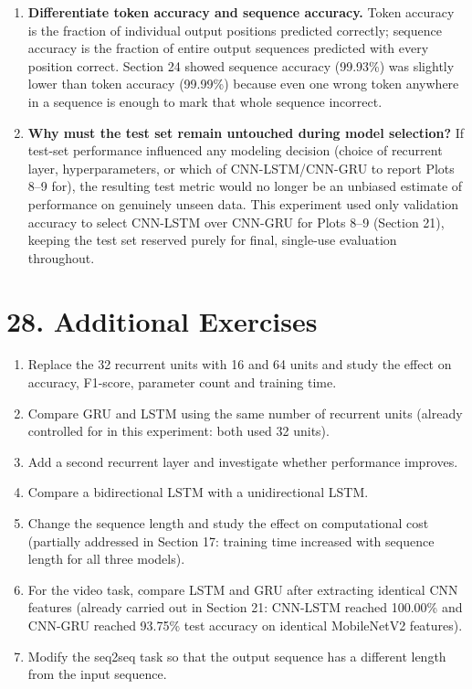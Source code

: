 \documentclass[10pt]{article}
\begin{document}
\begin{enumerate}
\item \textbf{Differentiate token accuracy and sequence accuracy.}
Token accuracy is the fraction of individual output positions predicted
correctly; sequence accuracy is the fraction of entire output sequences
predicted with every position correct. Section 24 showed sequence accuracy
(99.93\%) was slightly lower than token accuracy (99.99\%) because even one
wrong token anywhere in a sequence is enough to mark that whole sequence
incorrect.

\item \textbf{Why must the test set remain untouched during model
selection?}
If test-set performance influenced any modeling decision (choice of
recurrent layer, hyperparameters, or which of CNN-LSTM/CNN-GRU to report
Plots 8--9 for), the resulting test metric would no longer be an unbiased
estimate of performance on genuinely unseen data. This experiment used only
validation accuracy to select CNN-LSTM over CNN-GRU for Plots 8--9 (Section
21), keeping the test set reserved purely for final, single-use evaluation
throughout.

\end{enumerate}

\section*{28. Additional Exercises}

\begin{enumerate}
\item Replace the 32 recurrent units with 16 and 64 units and study the
effect on accuracy, F1-score, parameter count and training time.
\item Compare GRU and LSTM using the same number of recurrent units (already
controlled for in this experiment: both used 32 units).
\item Add a second recurrent layer and investigate whether performance
improves.
\item Compare a bidirectional LSTM with a unidirectional LSTM.
\item Change the sequence length and study the effect on computational cost
(partially addressed in Section 17: training time increased with sequence
length for all three models).
\item For the video task, compare LSTM and GRU after extracting identical
CNN features (already carried out in Section 21: CNN-LSTM reached 100.00\%
and CNN-GRU reached 93.75\% test accuracy on identical MobileNetV2
features).
\item Modify the seq2seq task so that the output sequence has a different
length from the input sequence.
\end{enumerate}
\end{document}
